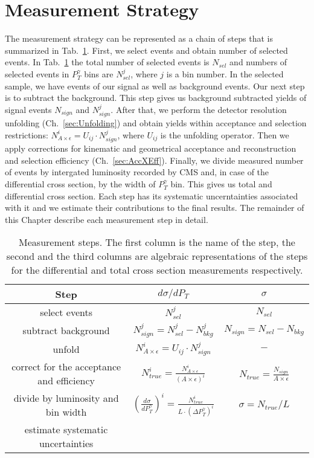 \section{Measurement Strategy}
\label{sec:AN_WgMeasStrategy}

The measurement strategy can be represented as a chain of steps that is summarized in Tab.~\ref{tab:analysisOutline}. First, we select events and obtain number of selected events. In Tab.~\ref{tab:analysisOutline} the total number of selected events is $N_{sel}$ and numbers of selected events in $P_T^{\gamma}$ bins are $N_{sel}^j$, where $j$ is a bin number. In the selected sample, we have events of our signal as well as background events. Our next step is to subtract the background. This step gives us background subtracted yields of signal events $N_{sign}$ and $N_{sign}^j$. After that, we perform the detector resolution unfolding (Ch.~\ref{sec:Unfolding}) and obtain yields within acceptance and selection restrictions: $N_{A\times\epsilon}^i = U_{ij} \cdot N_{sign}^j$, where $U_{ij}$ is the unfolding operator. Then we apply corrections for kinematic and geometrical acceptance and reconstruction and selection efficiency (Ch.~\ref{sec:AccXEff}). Finally, we divide measured number of events by intergated luminosity recorded by CMS and, in case of the differential cross section, by the width of $P_T^{\gamma}$ bin. This gives us total and differential cross section. Each step has its systematic uncerntainties associated with it and we estimate their contributions to the final results. The remainder of this Chapter describe each measurement step in detail.

\begin{table}[h]
  \small
  \begin{center}
  \caption{Measurement steps. The first column is the name of the step, the second and the third columns are algebraic representations of the steps for the differential and total cross section measurements respectively. }
  \begin{tabular}{|c|c|c|}
    \hline
    Step & $d\sigma/dP_{T}$ & $\sigma$ \\ \hline
    select events & $N_{sel}^j$ &    $N_{sel}$       \\ \hline
    subtract background & $N_{sign}^j = N_{sel}^j - N_{bkg}^j$ &    $N_{sign}=N_{sel}-N_{bkg}$       \\ \hline
    unfold   & $N_{A\times\epsilon}^i = U_{ij} \cdot N_{sign}^j$ &    $-$       \\ \hline
    correct for the acceptance and efficiency & $N_{true}^i = \frac{N_{A\times\epsilon}^i}{(A \times\epsilon)^i}$ &  $N_{true}=\frac{N_{sign}}{A\times\epsilon}$       \\ \hline
    divide by luminosity and bin width & $ \left( \frac{d\sigma}{dP_{T}^\gamma} \right) ^i = \frac{N_{true}^i}{L \cdot (\Delta P_T^\gamma)^i}$  &  $\sigma = N_{true}/L$       \\ \hline
    estimate systematic uncertainties &  &         \\ \hline
  \end{tabular}
  \label{tab:analysisOutline}
  \end{center}
\end{table}

